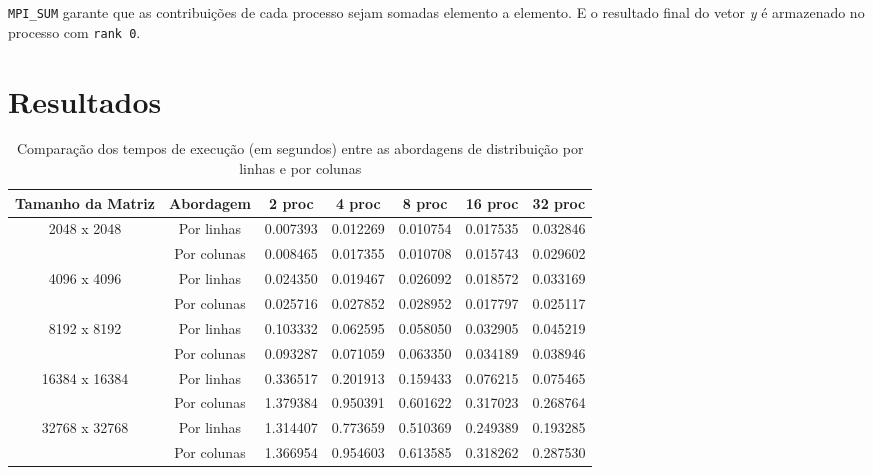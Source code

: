 \documentclass[a4paper, 12pt]{article}
\begin{document}
	\texttt{MPI\_SUM} garante que as contribuições de cada processo sejam somadas elemento a elemento. E o resultado final do vetor \textit{y} é armazenado no processo com \texttt{rank 0}.
	
	\section{Resultados}
	\begin{table}[H]
	\centering
	\begin{tabular}{|c|c|c|c|c|c|c|}
		\hline
		\textbf{Tamanho da Matriz} & \textbf{Abordagem} & \textbf{2 proc} & \textbf{4 proc} & \textbf{8 proc} & \textbf{16 proc} & \textbf{32 proc} \\
		\hline
		\multirow{2}{*}{2048 x 2048} & Por linhas  & 0.007393 & 0.012269 & 0.010754 & 0.017535 & 0.032846 \\
		& Por colunas & 0.008465 & 0.017355 & 0.010708 & 0.015743 & 0.029602 \\
		\hline
		\multirow{2}{*}{4096 x 4096} & Por linhas  & 0.024350 & 0.019467 & 0.026092 & 0.018572 & 0.033169 \\
		& Por colunas & 0.025716 & 0.027852 & 0.028952 & 0.017797 & 0.025117 \\
		\hline
		\multirow{2}{*}{8192 x 8192} & Por linhas  & 0.103332 & 0.062595 & 0.058050 & 0.032905 & 0.045219 \\
		& Por colunas & 0.093287 & 0.071059 & 0.063350 & 0.034189 & 0.038946 \\
		\hline
		\multirow{2}{*}{16384 x 16384} & Por linhas  & 0.336517 & 0.201913 & 0.159433 & 0.076215 & 0.075465 \\
		& Por colunas & 1.379384 & 0.950391 & 0.601622 & 0.317023 & 0.268764 \\
		\hline
		\multirow{2}{*}{32768 x 32768} & Por linhas  & 1.314407 & 0.773659 & 0.510369 & 0.249389 & 0.193285 \\
		& Por colunas & 1.366954 & 0.954603 & 0.613585 & 0.318262 & 0.287530 \\
		\hline
		\end{tabular}
		\caption{Comparação dos tempos de execução (em segundos) entre as abordagens de distribuição por linhas e por colunas}
		\label{tab:comparacao}
	\end{table}
\end{document}
